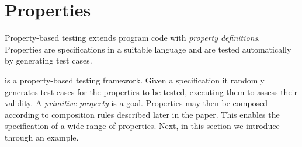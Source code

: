 


\section{Properties}
\label{sec:properties}

Property-based testing extends program code with {\em property definitions}.
%
Properties are specifications in a suitable language and are tested
automatically by generating test cases.



\plqc{} is a property-based testing framework.
%
%
Given a specification it randomly generates test cases for the properties to be tested,
 executing them to assess their validity.
%
A \emph{primitive property} is a \Prolog{} goal. %
%
Properties may then be composed according to composition rules described
later in the paper.
%
This enables the specification of a wide range of properties. %
%
%
Next, in this section we introduce \plqc{} through an example.



